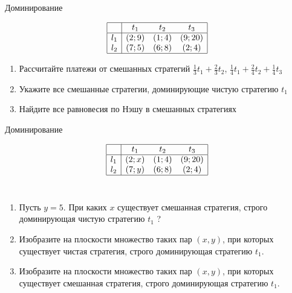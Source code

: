 \begin{problem}
 Доминирование

\[\begin{array}{|c|ccc|}  \hline {} & {t_{1} } & {t_{2} } & {t_{3} } \\  \hline {l_{1} } & {\left(2;9\right)} & {\left(1;4\right)} & {\left(9;20\right)} \\ {l_{2} } & {\left(7;5\right)} & {\left(6;8\right)} & {\left(2;4\right)} \\  \hline  \end{array}\]
\begin{enumerate}
\item	Рассчитайте платежи от смешанных стратегий  $\frac{1}{3} t_{1} +\frac{2}{3} t_{2} $,  $\frac{1}{4} t_{1} +\frac{2}{4} t_{2} +\frac{1}{4} t_{3} $

\item	Укажите все смешанные стратегии, доминирующие чистую стратегию  $t_{1} $

\item	Найдите все равновесия по Нэшу в смешанных стратегиях
\end{enumerate}


\begin{sol}

\end{sol}
\end{problem}



\begin{problem}
 Доминирование

\[\begin{array}{|c|ccc|}  \hline {} & {t_{1} } & {t_{2} } & {t_{3} } \\  \hline {l_{1} } & {\left(2;x\right)} & {\left(1;4\right)} & {\left(9;20\right)} \\ {l_{2} } & {\left(7;y\right)} & {\left(6;8\right)} & {\left(2;4\right)} \\  \hline  \end{array}\]\\
\begin{enumerate}
\item 	Пусть  $y=5$. При каких  $x$  существует смешанная стратегия, строго доминирующая чистую стратегию  $t_{1} $ ?\\
\item 	Изобразите на плоскости множество таких пар  $\left(x,y\right)$, при которых существует чистая стратегия, строго доминирующая стратегию  $t_{1} $.

\item 	Изобразите на плоскости множество таких пар  $\left(x,y\right)$, при которых существует смешанная стратегия, строго доминирующая стратегию  $t_{1} $.
\end{enumerate}


\begin{sol}

\end{sol}
\end{problem}




